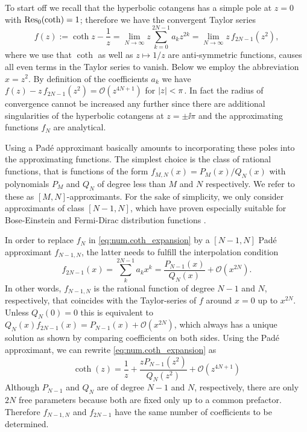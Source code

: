 To start off we recall that the hyperbolic cotangens has a simple pole at $z=0$ with $\operatorname{Res}_0(\coth) = 1$; therefore we have the convergent Taylor series
\begin{equation}
  f(z) := \coth z - \frac{1}{z} = \lim_{N\to\infty} z \sum_{k=0}^{2N-1} a_k z^{2k} = \lim_{N\to\infty} z \, f_{2N-1}(z^2)
  \label{eq:num.coth_expansion},
\end{equation}
where we use that $\coth$ as well as $z \mapsto 1/z$ are anti-symmetric functions, causes all even terms in the Taylor series to vanish.
Below we employ the abbreviation $x = z^2$.
By definition of the coefficients $a_k$ we have $f(z) - z \, f_{2N-1}(z^2) = \mathcal{O}(z^{4N + 1})$ for $\vert z \vert < \pi$.
In fact the radius of convergence cannot be increased any further since there are additional singularities of the hyperbolic cotangens at $z = \pm\ii\pi$ and the approximating functions $f_N$ are analytical.

Using a Padé approximant basically amounts to incorporating these poles into the approximating functions.
The simplest choice is the class of rational functions, that is functions of the form $f_{M,N}(x) = P_M(x) / Q_N(x)$ with polynomials $P_M$ and $Q_N$ of degree less than $M$ and $N$ respectively.
We refer to these as $[M,N]$-approximants.
For the sake of simplicity, we only consider approximants of class $[N-1, N]$, which have proven especially suitable for Bose-Einstein and Fermi-Dirac distribution functions \cite{Hu11_pade}.

In order to replace $f_N$ in \autoref{eq:num.coth_expansion} by a $[N-1,N]$ Padé approximant $f_{N-1,N}$, the latter needs to fulfill the interpolation condition
\begin{equation}
  f_{2N-1}(x) = \sum_k^{2N-1} a_k x^k = \frac{P_{N-1}(x)}{Q_N(x)} + \mathcal{O}(x^{2N}).
  \label{eq:num.pade_interpolation}
\end{equation}
In other words, $f_{N-1,N}$ is the rational function of degree $N-1$ and $N$, respectively, that coincides with the Taylor-series of $f$ around $x = 0$ up to $x^{2N}$.
Unless $Q_N(0) = 0$ this is equivalent to $Q_N(x)f_{2N-1}(x) = P_{N-1}(x) + \mathcal{O}(x^{2N})$, which always has a unique solution as shown by comparing coefficients on both sides.
Using the Padé approximant, we can rewrite \autoref{eq:num.coth_expansion} as
\begin{equation}
  \coth(z) = \frac{1}{z} + \frac{z P_{N-1}(z^2)}{Q_N(z^2)} + \mathcal{O}(z^{4N+1})
  \label{eq:num.coth_pade}
\end{equation}
Although $P_{N-1}$ and $Q_N$ are of degree $N-1$ and $N$, respectively, there are only $2N$ free parameters because both are fixed only up to a common prefactor.
Therefore $f_{N-1,N}$ and $f_{2N-1}$ have the same number of coefficients to be determined.\\




